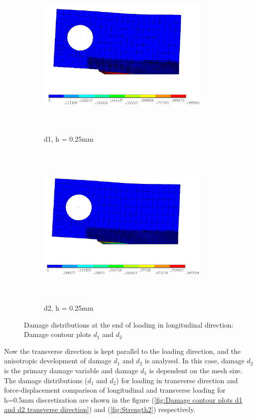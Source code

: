 \documentclass[a4paper,12pt,twoside]{report}
\begin{document}
\begin{figure}[htbp!]\ContinuedFloat
     \begin{subfigure}{0.4\textwidth}
         \centering
         \includegraphics[width=8.3cm,height=8.2cm,keepaspectratio]{26.d1-0.25.png}
         \caption{d1, h = 0.25mm}
         \label{fig:d1-0.25}
     \end{subfigure}
     \hspace{1.8cm}
     \begin{subfigure}{0.4\textwidth}
         \centering
         \includegraphics[width=8.3cm,height=8cm,keepaspectratio]{26.d2-0.25.png}
         \caption{d2, h = 0.25mm}
         \label{fig:d2-0.25}
     \end{subfigure}     
        \caption{Damage distributions at the end of loading in longitudinal direction: Damage contour plots $d_{1}$ and $d_{2}$ }
        \label{fig: Damage contour plots d1 and d2}     
\end{figure}
\FloatBarrier 
\indent\indent\indent Now the transverse direction is kept parallel to the loading direction, and the anisotropic development of damage $d_{1}$ and $d_{2}$ is analysed. In this case, damage $d_{2}$ is the primary damage variable and damage $d_{1}$ is dependent on the mesh size.  The damage distributions ($d_{1}$ and $d_{2}$) for loading in transverse direction and force-displacement comparison of  longitudinal and transverse loading for h=0.5mm discretization are shown in the figure (\ref{fig:Damage contour plots d1 and d2 transverse direction}) and (\ref{fig:Strength2}) respectively.
\end{document}
